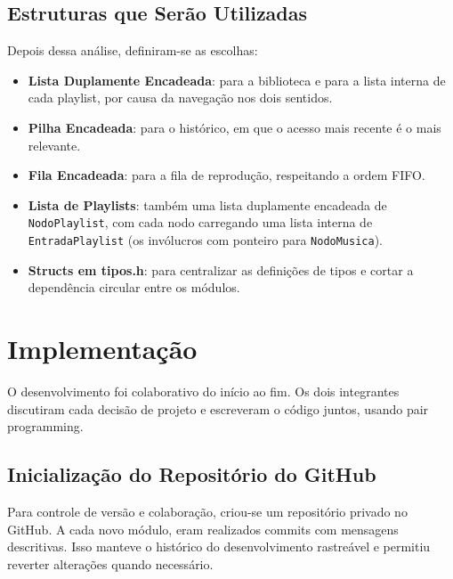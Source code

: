 \documentclass[
    12pt
    ,oneside
    ,a4paper
    ,chapter=TITLE
    ,section=TITLE
    ,sumario=abnt-6027-2012]{abntex2}
\begin{document}
\section{Estruturas que Serão Utilizadas}

Depois dessa análise, definiram-se as escolhas:

\begin{itemize}
    \item \textbf{Lista Duplamente Encadeada}: para a biblioteca e para a lista interna de cada playlist, por causa da navegação nos dois sentidos.
    \item \textbf{Pilha Encadeada}: para o histórico, em que o acesso mais recente é o mais relevante.
    \item \textbf{Fila Encadeada}: para a fila de reprodução, respeitando a ordem FIFO.
    \item \textbf{Lista de Playlists}: também uma lista duplamente encadeada de \texttt{NodoPlaylist}, com cada nodo carregando uma lista interna de \texttt{EntradaPlaylist} (os invólucros com ponteiro para \texttt{NodoMusica}).
    \item \textbf{Structs em tipos.h}: para centralizar as definições de tipos e cortar a dependência circular entre os módulos.
\end{itemize}

\chapter{Implementação}
\label{cap:implementacao}

O desenvolvimento foi colaborativo do início ao fim. Os dois integrantes discutiram cada decisão de projeto e escreveram o código juntos, usando pair programming.

\section{Inicialização do Repositório do GitHub}

Para controle de versão e colaboração, criou-se um repositório privado no GitHub. A cada novo módulo, eram realizados commits com mensagens descritivas. Isso manteve o histórico do desenvolvimento rastreável e permitiu reverter alterações quando necessário.
\end{document}
